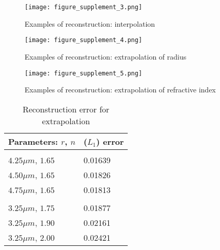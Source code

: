 \documentclass[main.tex]{subfiles}
\begin{document}
\begin{figure}[H]
    \begin{center}
    \texttt{[image: figure\_supplement\_3.png]}
    \caption{Examples of reconstruction: interpolation}
    \label{fig:interp}
    \end{center}
\end{figure}
\vspace*{-0.5cm}
\begin{figure}[H]
    \begin{center}
    \texttt{[image: figure\_supplement\_4.png]}
    \caption{Examples of reconstruction: extrapolation of radius}
    \label{fig:extrp_rad}
    \end{center}
\end{figure}

\begin{figure}[H]
    \begin{center}
    \texttt{[image: figure\_supplement\_5.png]}
    \caption{Examples of reconstruction: extrapolation of refractive index}
    \label{fig:extrp_ri}
    \end{center}
\end{figure}

\begin{table}[H]
\caption{Reconstruction error for extrapolation}
\label{tab:extr}
\begin{center}
\begin{tabular}{ll}
\multicolumn{1}{c}{\bf Parameters: $ r$, $ n$ }  &\multicolumn{1}{c}{\bf ($ L_1$) error}
\\ \hline \\
$4.25\mu m$, $1.65$ &0.01639\\
 $4.50\mu m$, $1.65$ &0.01826\\
 $4.75\mu m$, $1.65$  &0.01813 \\
 & \\
 $3.25\mu m$, $1.75$ &0.01877 \\
 $3.25\mu m$, $1.90$ &0.02161\\
 $3.25\mu m$, $2.00$  &0.02421\\
\end{tabular}
\end{center}
\end{table}
\end{document}

